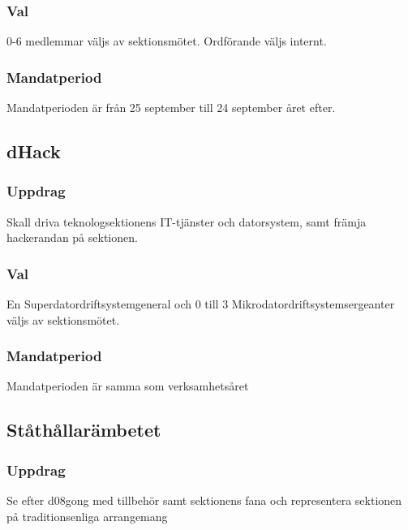 \subsubsection{Val}
0-6 medlemmar väljs av sektionsmötet. Ordförande väljs internt.
\subsubsection{Mandatperiod}
Mandatperioden är från 25 september till 24 september året efter.


\subsection{dHack}
\subsubsection{Uppdrag}
Skall driva teknologsektionens IT-tjänster och datorsystem, samt
främja hackerandan på sektionen.
\subsubsection{Val}
En Superdatordriftsystemgeneral och 0 till 3 Mikrodatordriftsystemsergeanter väljs av sektionsmötet.
\subsubsection{Mandatperiod}
Mandatperioden är samma som verksamhetsåret

\subsection{Ståthållarämbetet}
\subsubsection{Uppdrag}
Se efter d08gong med tillbehör samt sektionens fana och representera sektionen på traditionsenliga arrangemang
